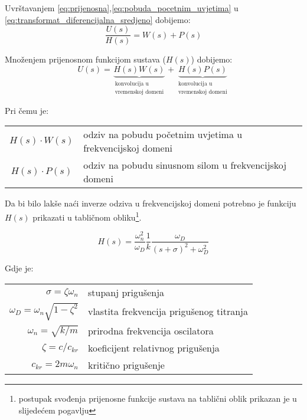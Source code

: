Uvrštavanjem \eqref{eq:prijenosna},\eqref{eq:pobuda_pocetnim_uvjetima} u 
\eqref{eq:transformat_diferencijalna_sredjeno} dobijemo:
\begin{equation*}
	\frac{U(s)}{H(s)}=W(s)+P(s)
\end{equation*}

Množenjem prijenosnom funkcijom sustava ($H(s)$) dobijemo:
\begin{equation}
	U(s)=\underbrace{H(s)W(s)}_{\substack{\text{konvolucija u}\\\text{vremenskoj
	domeni}}}
	+ 
	\underbrace{H(s)P(s)}_{\substack{\text{konvolucija u}\\\text{vremenskoj domeni}}}
\end{equation}

Pri čemu je:
\begin{table}[H]
\begin{tabular}{c l}
	$H(s)\cdot W(s)$ & odziv na pobudu početnim uvjetima u frekvencijskoj domeni\\
	$H(s)\cdot P(s)$ & odziv na pobudu sinusnom silom u frekvencijskoj domeni\\
\end{tabular}
\end{table}

\newpage
Da bi bilo lakše naći inverze odziva u frekvencijskoj domeni potrebno je funkciju  
$H(s)$ prikazati u tabličnom obliku\footnote{postupak svođenja prijenosne funkcije
sustava na tablični oblik prikazan je u slijedećem pogavlju}.

\begin{equation}\label{eq:pfs_tablicni_oblik}
    H(s) = \frac{\omega_n^2}{\omega_D}
           \frac{1}{k}
           \frac{\omega_D}{(s+\sigma)^2+\omega_D^2}
\end{equation}

Gdje je:\\
\begin{table}[H]
    \begin{tabular}{r l}
        $\sigma=\zeta\omega_n$ & stupanj prigušenja\\
        $\omega_D=\omega_n\sqrt{1-\zeta^2}$ & vlastita frekvencija prigušenog titranja\\
        $\omega_n=\sqrt{k/m}$ & prirodna frekvencija oscilatora\\
        $\zeta=c/c_{kr}$ & koeficijent relativnog prigušenja\\
        $c_{kr}=2m\omega_n$ & kritično prigušenje
    \end{tabular}
\end{table}

